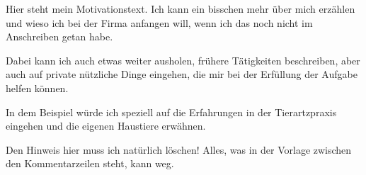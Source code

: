 \documentclass[fontsize=12pt,parskip=half-]{scrartcl}
\begin{document}

\begin{Motivation}
    Hier steht mein Motivationstext. Ich kann ein bisschen mehr
    über mich erzählen und wieso ich bei der Firma anfangen will,
    wenn ich das noch nicht im Anschreiben getan habe.
    
    Dabei kann ich auch etwas weiter ausholen, frühere Tätigkeiten
    beschreiben, aber auch auf private nützliche Dinge eingehen,
    die mir bei der Erfüllung der Aufgabe helfen können.
    
    In dem Beispiel würde ich speziell auf die Erfahrungen in der
    Tierartzpraxis eingehen und die eigenen Haustiere erwähnen.
    
    Den Hinweis hier muss ich natürlich löschen! Alles, was in der Vorlage
    zwischen den Kommentarzeilen steht, kann weg.
\end{Motivation}



\begin{Anlagenverzeichnis}
    \begin{Auflistung}
    \end{Auflistung}

    \begin{Auflistung}
    \end{Auflistung}
\end{Anlagenverzeichnis}


\end{document}
